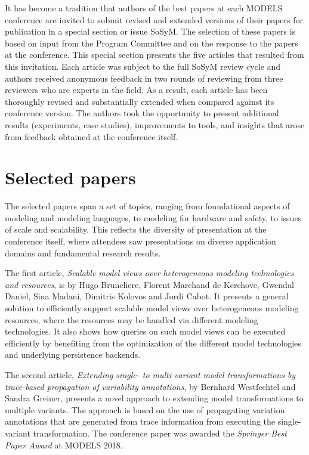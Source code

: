 \documentclass{svjour3}                     %
\begin{document}
It has become a tradition that authors of the best papers at each MODELS conference are invited to submit revised and extended versions of their papers for publication in a special section or issue SoSyM. The selection of these papers is based on input from the Program Committee and on the response to the papers at the conference.
This special section presents the five articles that resulted from this invitation. Each article was subject to the full SoSyM review cycle and authors received anonymous feedback in two rounds of reviewing from three reviewers who are experts in the field. As a result, each article has been thoroughly revised and substantially extended when compared against its conference version. The authors took the opportunity to present additional results (experiments, case studies), improvements to tools, and insights
that arose from feedback obtained at the conference itself.

\section{Selected papers}
The selected papers span a set of topics, ranging from foundational aspects of modeling and modeling languages, to modeling
for hardware and safety, to issues of scale and scalability. This reflects the diversity of presentation at the conference itself, where
attendees saw presentations on diverse application domains and fundamental research results.

The first article, \textit{Scalable model views over heterogeneous modeling technologies and resources}, is by
Hugo Bruneliere, Florent Marchand de Kerchove, Gwendal Daniel, Sina Madani, Dimitris Kolovos and Jordi Cabot. It presents
a general solution to efficiently support scalable model views over heterogeneous modeling resources, where the resources may
be handled via different modeling technologies. It also shows how queries on such model
views can be executed efficiently by benefiting from the optimization of the
different model technologies and underlying persistence backends.

The second article, \textit{Extending single- to multi-variant model transformations by trace-based propagation of variability annotations}, by
Bernhard Westfechtel and Sandra Greiner, presents a novel approach to extending model transformations to multiple variants. The approach is
based on the use of propagating variation
annotations that are generated from trace information from executing the single-variant transformation. The conference paper was awarded the \textit{Springer
Best Paper Award} at MODELS 2018.
\end{document}
